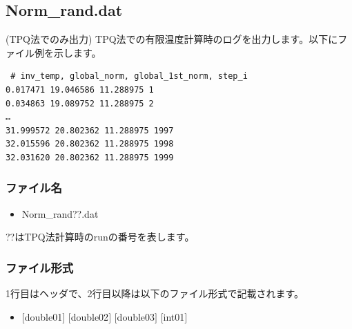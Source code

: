 \newpage
\subsection{Norm\_rand.dat}
\label{Subsec:normrand}
(TPQ法でのみ出力) TPQ法での有限温度計算時のログを出力します。以下にファイル例を示します。\\
\begin{minipage}{12.5cm}
\begin{screen}
\begin{verbatim}
 # inv_temp, global_norm, global_1st_norm, step_i 
0.017471 19.046586 11.288975 1
0.034863 19.089752 11.288975 2
…
31.999572 20.802362 11.288975 1997
32.015596 20.802362 11.288975 1998
32.031620 20.802362 11.288975 1999
\end{verbatim}
\end{screen}
\end{minipage}

\subsubsection{ファイル名}
\begin{itemize}
   \item Norm\_rand??.dat
  \end{itemize}
  ??はTPQ法計算時のrunの番号を表します。


\subsubsection{ファイル形式}
1行目はヘッダで、2行目以降は以下のファイル形式で記載されます。
 \begin{itemize}
   \item $[$double01$]$ $[$double02$]$ $[$double03$]$ $[$int01$]$
  \end{itemize}
